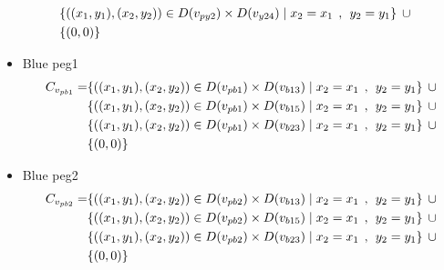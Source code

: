 \begin{appendices}
\begin{itemize}
\begin{align*}
\\&\{((x_{1},y_{1}),(x_{2},y_{2}))\in D(v_{py2}) \times D(v_{y24})\mid x_{2} = x_{1} \hspace{1ex} , \hspace{1ex}  y_{2} = y_{1}\} \hspace{1ex}\cup
\\& \{(0,0)\}
\end{align*}
  \item Blue peg1\\
  \begin{align*}
C_{v_{pb1}} = &\{((x_{1},y_{1}),(x_{2},y_{2}))\in D(v_{pb1}) \times D(v_{b13})\mid x_{2} = x_{1} \hspace{1ex} , \hspace{1ex}  y_{2} = y_{1}\} \hspace{1ex} \cup 
\\& \{((x_{1},y_{1}),(x_{2},y_{2}))\in D(v_{pb1}) \times D(v_{b15})\mid x_{2} = x_{1} \hspace{1ex} , \hspace{1ex}  y_{2} = y_{1}\} \hspace{1ex} \cup 
\\& \{ ((x_{1},y_{1}),(x_{2},y_{2}))\in D(v_{pb1}) \times D(v_{b23})\mid x_{2} = x_{1} \hspace{1ex} , \hspace{1ex}  y_{2} = y_{1}\} \hspace{1ex} \cup 
\\& \{(0,0)\}
\end{align*}
  \item Blue peg2\\
  \begin{align*}
\Constraint{pb2} = &\{((x_{1},y_{1}),(x_{2},y_{2}))\in \Domain{pb2} \times \Domain{b13}\mid x_{2} = x_{1} \hspace{1ex} , \hspace{1ex}  y_{2} = y_{1}\} \hspace{1ex} \cup \\& \{((x_{1},y_{1}),(x_{2},y_{2}))\in \Domain{pb2} \times \Domain{b15}\mid x_{2} = x_{1} \hspace{1ex} , \hspace{1ex}  y_{2} = y_{1}\} \hspace{1ex} \cup \\& \{ ((x_{1},y_{1}),(x_{2},y_{2}))\in \Domain{pb2} \times \Domain{b23}\mid x_{2} = x_{1} \hspace{1ex} , \hspace{1ex}  y_{2} = y_{1}\} \hspace{1ex} \cup \\& \{(0,0)\}

\end{align*}
\end{itemize}
\end{appendices}

